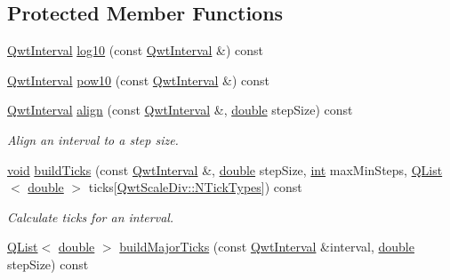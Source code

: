 \subsection*{Protected Member Functions}
\begin{DoxyCompactItemize}
\item 
\hyperlink{class_qwt_interval}{Qwt\-Interval} \hyperlink{class_qwt_log10_scale_engine_a3fed7b3b4949eb5997ed162ce7dc815f}{log10} (const \hyperlink{class_qwt_interval}{Qwt\-Interval} \&) const 
\item 
\hyperlink{class_qwt_interval}{Qwt\-Interval} \hyperlink{class_qwt_log10_scale_engine_a67cc3099b1e4bb19c96192c94fe9df6d}{pow10} (const \hyperlink{class_qwt_interval}{Qwt\-Interval} \&) const 
\item 
\hyperlink{class_qwt_interval}{Qwt\-Interval} \hyperlink{class_qwt_log10_scale_engine_aab30461457bb284620bea12c68c5dc04}{align} (const \hyperlink{class_qwt_interval}{Qwt\-Interval} \&, \hyperlink{_super_l_u_support_8h_a8956b2b9f49bf918deed98379d159ca7}{double} step\-Size) const 
\begin{DoxyCompactList}\small\item\em Align an interval to a step size. \end{DoxyCompactList}\item 
\hyperlink{group___u_a_v_objects_plugin_ga444cf2ff3f0ecbe028adce838d373f5c}{void} \hyperlink{class_qwt_log10_scale_engine_af93bb73acd240eb53a45f1bc822334e8}{build\-Ticks} (const \hyperlink{class_qwt_interval}{Qwt\-Interval} \&, \hyperlink{_super_l_u_support_8h_a8956b2b9f49bf918deed98379d159ca7}{double} step\-Size, \hyperlink{ioapi_8h_a787fa3cf048117ba7123753c1e74fcd6}{int} max\-Min\-Steps, \hyperlink{class_q_list}{Q\-List}$<$ \hyperlink{_super_l_u_support_8h_a8956b2b9f49bf918deed98379d159ca7}{double} $>$ ticks\mbox{[}\hyperlink{class_qwt_scale_div_af21aedaa886dd5e067cf63505838736ca86796bbf72d5eb7162a924ba27ce6553}{Qwt\-Scale\-Div\-::\-N\-Tick\-Types}\mbox{]}) const 
\begin{DoxyCompactList}\small\item\em Calculate ticks for an interval. \end{DoxyCompactList}\item 
\hyperlink{class_q_list}{Q\-List}$<$ \hyperlink{_super_l_u_support_8h_a8956b2b9f49bf918deed98379d159ca7}{double} $>$ \hyperlink{class_qwt_log10_scale_engine_a1312b8f5513d5bb20c4a7fa74eeeb9c6}{build\-Major\-Ticks} (const \hyperlink{class_qwt_interval}{Qwt\-Interval} \&interval, \hyperlink{_super_l_u_support_8h_a8956b2b9f49bf918deed98379d159ca7}{double} step\-Size) const 

\end{DoxyCompactItemize}
